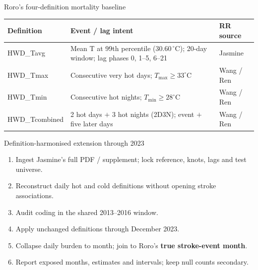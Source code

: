 \begin{frame}{Roro's four-definition mortality baseline}
  \scriptsize
  \renewcommand{\arraystretch}{1.15}
  \begin{tabular}{@{}p{}p{}p{}@{}}
    \toprule
    \textbf{Definition} & \textbf{Event / lag intent} & \textbf{RR source} \\
    \midrule
    HWD\_Tavg & Mean T at 99th percentile (30.60\,$^\circ$C);
      20-day window; lag phases 0, 1--5, 6--21 & Jasmine \\
    HWD\_Tmax & Consecutive very hot days; $T_{\max}\geq33^\circ$C & Wang / Ren \\
    HWD\_Tmin & Consecutive hot nights; $T_{\min}\geq28^\circ$C & Wang / Ren \\
    HWD\_Tcombined & 2 hot days $+$ 3 hot nights (2D3N);
      event $+$ five later days & Wang / Ren \\
    \bottomrule
  \end{tabular}

  \vspace{0.55em}
\end{frame}

\begin{frame}{Definition-harmonised extension through 2023}
  \footnotesize
  \begin{enumerate}
    \item Ingest Jasmine's full PDF / supplement; lock reference, knots, lags and test universe.
    \item Reconstruct daily hot and cold definitions without opening stroke associations.
    \item Audit coding in the shared 2013--2016 window.
    \item Apply unchanged definitions through December 2023.
    \item Collapse daily burden to month; join to Roro's \textbf{true stroke-event month}.
    \item Report exposed months, estimates and intervals; keep null counts secondary.
  \end{enumerate}

  \vspace{0.45em}
\end{frame}

